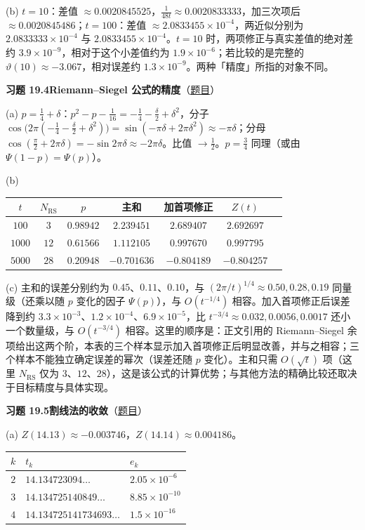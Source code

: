 \documentclass[11pt,a4paper]{article}
\newcommand{\Sol}[2]{%
  \par\addvspace{1.2em}\noindent
  \hypertarget{s:#1}{}\textbf{习题 #1\quad #2}\hfill{\small（\hyperlink{q:#1}{题目}）}\par
  \nopagebreak\smallskip}
\begin{document}
(b) $t=10$：差值 $\approx0.0020845525$，$\frac1{48t}\approx0.0020833333$，加三次项后 $\approx0.0020845486$；$t=100$：差值 $\approx2.0833455\times10^{-4}$，两近似分别为 $2.0833333\times10^{-4}$ 与 $2.0833455\times10^{-4}$。$t=10$ 时，两项修正与真实差值的绝对差约 $3.9\times10^{-9}$，相对于这个小差值约为 $1.9\times10^{-6}$；若比较的是完整的 $\vartheta(10)\approx-3.067$，相对误差约 $1.3\times10^{-9}$。两种「精度」所指的对象不同。

\Sol{19.4}{Riemann--Siegel 公式的精度}
(a) $p=\frac14+\delta$：$p^2-p-\frac1{16}=-\frac14-\frac\delta2+\delta^2$，分子 $\cos\bigl(2\pi(-\frac14-\frac\delta2+\delta^2)\bigr)=\sin(-\pi\delta+2\pi\delta^2)\approx-\pi\delta$；分母 $\cos(\frac\pi2+2\pi\delta)=-\sin2\pi\delta\approx-2\pi\delta$。比值 $\to\frac12$。$p=\frac34$ 同理（或由 $\Psi(1-p)=\Psi(p)$）。

(b)
\begin{center}
\small
\begin{tabular}{@{}ccccccc@{}}
\toprule
$t$ & $N_{\mathrm{RS}}$ & $p$ & 主和 & 加首项修正 & $Z(t)$ \\
\midrule
$100$ & $3$ & $0.98942$ & $2.239451$ & $2.689407$ & $2.692697$ \\
$1000$ & $12$ & $0.61566$ & $1.112105$ & $0.997670$ & $0.997795$ \\
$5000$ & $28$ & $0.20948$ & $-0.701636$ & $-0.804189$ & $-0.804257$ \\
\bottomrule
\end{tabular}
\end{center}

(c) 主和的误差分别约为 $0.45$、$0.11$、$0.10$，与 $(2\pi/t)^{1/4}\approx0.50,0.28,0.19$ 同量级（还乘以随 $p$ 变化的因子 $\Psi(p)$），与 $O(t^{-1/4})$ 相容。加入首项修正后误差降到约 $3.3\times10^{-3}$、$1.2\times10^{-4}$、$6.9\times10^{-5}$，比 $t^{-3/4}\approx0.032,0.0056,0.0017$ 还小一个数量级，与 $O(t^{-3/4})$ 相容。这里的顺序是：正文引用的 Riemann--Siegel 余项给出这两个阶，本表的三个样本显示加入首项修正后明显改善，并与之相容；三个样本不能独立确定误差的幂次（误差还随 $p$ 变化）。主和只需 $O(\sqrt t)$ 项（这里 $N_{\mathrm{RS}}$ 仅为 $3$、$12$、$28$），这是该公式的计算优势；与其他方法的精确比较还取决于目标精度与具体实现。

\Sol{19.5}{割线法的收敛}
(a) $Z(14.13)\approx-0.003746$，$Z(14.14)\approx0.004186$。
\begin{center}
\small
\begin{tabular}{@{}cll@{}}
\toprule
$k$ & $t_k$ & $e_k$ \\
\midrule
$2$ & $14.134723094\ldots$ & $2.05\times10^{-6}$ \\
$3$ & $14.134725140849\ldots$ & $8.85\times10^{-10}$ \\
$4$ & $14.134725141734693\ldots$ & $1.5\times10^{-16}$ \\
\bottomrule
\end{tabular}
\end{center}
\end{document}
